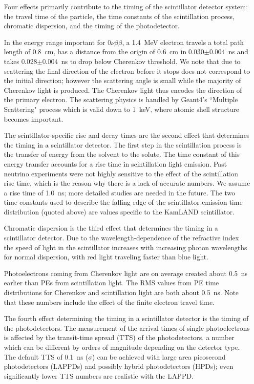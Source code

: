 Four effects primarily contribute to the timing of the scintillator detector
system: the travel time of the particle, the time constants of the scintillation process, chromatic dispersion, and the timing of the photodetector.

In the energy range important for $0\nu\beta\beta$, a 1.4~MeV electron travels a total path length of 0.8~cm, has a distance from the origin of 0.6~cm in 0.030$\pm$0.004~ns  and takes 0.028$\pm$0.004~ns to drop below Cherenkov threshold. We note that due to scattering the final direction of the electron before it stops does not correspond to the initial direction; however the scattering angle is small while the majority of Cherenkov light is produced. The Cherenkov light thus encodes the direction of the primary electron. The scattering physics is handled by Geant4's ``Multiple Scattering" process which is valid down to 1~keV, where atomic shell structure becomes important\cite{geant4scatt}.


The scintillator-specific rise and decay times are the second effect that determines the timing in a scintillator detector. The first step in the scintillation process is the transfer of energy from the solvent to the solute. The time constant of this
energy transfer accounts for a rise time in scintillation light
emission. Past neutrino experiments were not highly sensitive to the
effect of the scintillation rise time, which is the reason why there
is a lack of accurate numbers. We assume a rise time of 1.0~ns; more
detailed studies are needed in the future. The two time constants used
to describe the falling edge of the scintillator emission time
distribution (quoted above) are values specific to the KamLAND
scintillator.

Chromatic dispersion is the third effect that determines the timing in a scintillator detector. Due to the wavelength-dependence of the refractive index the speed of
light in the scintillator increases
with increasing photon wavelengths for normal dispersion, with red
light traveling faster than blue light.

Photoelectrons coming from Cherenkov light are on average
created about 0.5~ns earlier than PEs from scintillation light. The
RMS values from PE time distributions for Cherenkov and scintillation
light are both about 0.5~ns. Note that these numbers include the
effect of the finite electron travel time.

The fourth effect determining the timing in a scintillator detector is the timing of the photodetectors. The measurement of the arrival times of single photoelectrons is
affected by the transit-time spread (TTS) of the photodetectors, a
number which can be different by orders of magnitude depending on the
detector type. The default TTS of 0.1~ns ($\sigma$) can be achieved with large area picosecond photodetectors
(LAPPDs)\cite{Adams:2013nva,RSI_paper,PSEC4_paper,anode_paper} and possibly hybrid photodetectors
(HPDs)\cite{hpdThesis}; even significantly lower TTS numbers are
realistic with the LAPPD\cite{RSI_paper,PSEC4_paper,anode_paper}.

